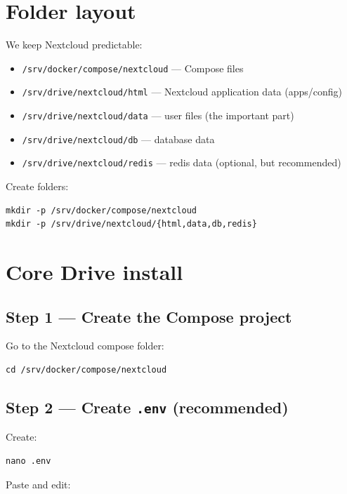 
\section{Folder layout}
We keep Nextcloud predictable:

\begin{itemize}[leftmargin=*]
  \item \texttt{/srv/docker/compose/nextcloud} --- Compose files
  \item \texttt{/srv/drive/nextcloud/html} --- Nextcloud application data (apps/config)
  \item \texttt{/srv/drive/nextcloud/data} --- user files (the important part)
  \item \texttt{/srv/drive/nextcloud/db} --- database data
  \item \texttt{/srv/drive/nextcloud/redis} --- redis data (optional, but recommended)
\end{itemize}

Create folders:

\begin{lstlisting}
mkdir -p /srv/docker/compose/nextcloud
mkdir -p /srv/drive/nextcloud/{html,data,db,redis}
\end{lstlisting}

\section{Core Drive install}
\subsection{Step 1 --- Create the Compose project}
\label{sec:nc_core_start}
Go to the Nextcloud compose folder:

\begin{lstlisting}
cd /srv/docker/compose/nextcloud
\end{lstlisting}

\subsection{Step 2 --- Create \texttt{.env} (recommended)}
Create:

\begin{lstlisting}
nano .env
\end{lstlisting}

Paste and edit:

